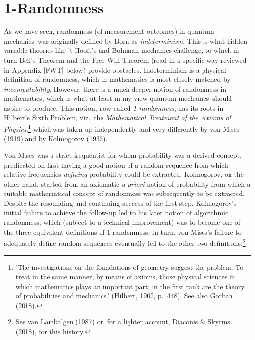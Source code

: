 \documentclass[12pt]{article}
\numberwithin{equation}{section}
\newcommand{\qm}{quantum mechanics}
\begin{document}
 \section{1-Randomness}\label{AR}
 As we have seen, randomness (of measurement outcomes) in \qm\ was originally defined by Born as \emph{indeterminism}. This is  what hidden variable theories like 't Hooft's and Bohmian mechanics challenge, to which in turn Bell's Theorem and the Free Will Theorem (read in a specific way reviewed in Appendix \ref{FWT} below) provide obstacles. Indeterminism is a physical definition of randomness, which in mathematics is most closely matched by \emph{incomputability}. However, there is a much deeper notion of randomness in mathematics, which is what at least in my view \qm\  should aspire to produce. 
This notion, now called \emph{1-randomness}, has its roots in Hilbert's Sixth Problem, viz.\ the \emph{Mathematical Treatment of the Axioms of Physics},\footnote{`The investigations on the foundations of geometry suggest the problem: To treat in the same manner, by means of axioms, those physical sciences in which mathematics plays an important part; in the first rank are the theory of probabilities and mechanics.' (Hilbert, 1902, p.\ 448). See also Gorban (2018).} which was taken up independently and very differently  by von Mises (1919) and by Kolmogorov (1933). 

 Von Mises was a strict frequentist for whom probability was a derived concept, predicated on first having a good notion of a random sequence from which relative frequencies \emph{defining} probability could be extracted. Kolmogorov, on the other hand, started from an axiomatic \emph{a priori} notion of probability from which a suitable mathematical concept of randomness was subsequently to be extracted. Despite the resounding and continuing success of the first step, 
Kolmogorov's initial failure to achieve the follow-up  led to his later notion of algorithmic randomness, which (subject to a technical improvement) was to become one of the three equivalent definitions of 1-randomness. In turn, von Mises's failure to adequately define random sequences eventually led to the other two definitions.\footnote{See van Lambalgen (1987) or, for a lighter account, Diaconis \& Skyrms (2018), for this history. }  
\end{document}
